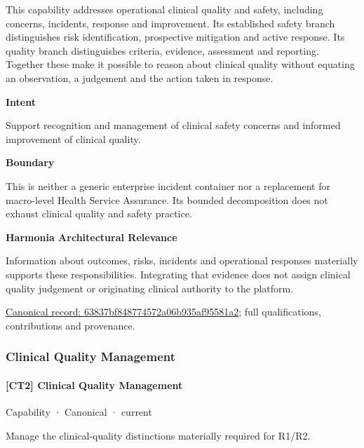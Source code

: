 This capability addresses operational clinical quality and safety, including concerns, incidents, response and improvement. Its established safety branch distinguishes risk identification, prospective mitigation and active response. Its quality branch distinguishes criteria, evidence, assessment and reporting. Together these make it possible to reason about clinical quality without equating an observation, a judgement and the action taken in response.



\textbf{Intent}



Support recognition and management of clinical safety concerns and informed improvement of clinical quality.



\textbf{Boundary}



This is neither a generic enterprise incident container nor a replacement for macro-level Health Service Assurance. Its bounded decomposition does not exhaust clinical quality and safety practice.



\textbf{Harmonia Architectural Relevance}



Information about outcomes, risks, incidents and operational responses materially supports these responsibilities. Integrating that evidence does not assign clinical quality judgement or originating clinical authority to the platform.


{\footnotesize \href{../../../../continuum/strategy/capability/63837bf848774572a06b935af95581a2.md}{Canonical record: 63837bf848774572a06b935af95581a2}; full qualifications, contributions and provenance.}\par
\subsubsection{Clinical Quality Management}

\paragraph{[CT2] Clinical Quality Management}

\label{element:89761f2d38f846c39df1df0975964288}
{\small Capability · Canonical · current}\par

Manage the clinical-quality distinctions materially required for R1/R2.



